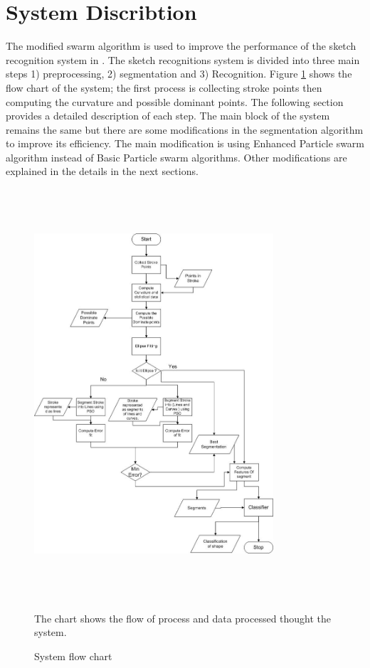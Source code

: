 \documentclass[12pt,1p,times]{elsarticle}%
\begin{document}
\section{System Discribtion  }\label{Sysdisc}
The modified swarm algorithm is used to improve the performance of the sketch recognition system in \cite{mypaper}. The sketch recognitions system is divided into three main steps 1) preprocessing, 2) segmentation and 3) Recognition. Figure \ref{fig:flowChart} shows the flow chart of the system; the first process is collecting stroke points then computing the curvature and possible dominant points.  The following section provides a detailed description of each step. The main block of the system remains the same but there are some modifications in the segmentation algorithm to improve its efficiency. The main modification is using Enhanced Particle swarm algorithm instead of Basic Particle swarm algorithms. Other modifications are explained in the details in the next sections.  
 \begin{figure}
	\centering
		\includegraphics[width=3.5in,height=6in]{FlowChart.jpg}
	\caption{System flow chart} The chart shows the flow of process and data processed thought the system. 
	\label{fig:flowChart}
\end{figure}
\end{document}
